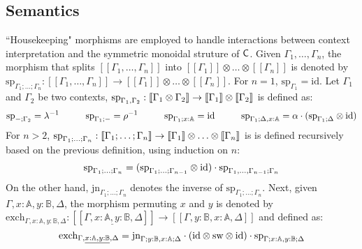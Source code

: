 \subsection{Semantics}

``Housekeeping" morphisms are employed to handle interactions between context interpretation and the symmetric monoidal struture of $\mathsf{C}$. Given $\Gamma_{1}, \ldots, \Gamma_{n}$, the morphism that splits $[\![\Gamma_{1}, \ldots, \Gamma_{n}]\!]$ into $[\![\Gamma_{1}]\!] \otimes \ldots \otimes [\![\Gamma_{n}]\!]  $ is denoted by $\text{sp}_{\Gamma_1;\ldots;\Gamma_n}: [\![\Gamma_{1}, \ldots, \Gamma_{n}]\!] \xrightarrow{} [\![\Gamma_{1}]\!] \otimes \ldots \otimes [\![\Gamma_{n}]\!] $. For $n=1$, $\text{sp}_{\Gamma_1} = \text{id}$.
Let $\Gamma_1$ and $\Gamma_2$ be two contexts, $\text{sp}_{\Gamma_1, \Gamma_2}: \left \llbracket  \Gamma_1\otimes \Gamma_2 \right \rrbracket \rightarrow \left \llbracket \Gamma_1 \right \rrbracket\otimes \left \llbracket \Gamma_2 \right \rrbracket$ is defined as:
\begin{equation*}
  \text{sp}_{-; \Gamma_2} = \lambda^{-1} \hspace{1cm} \text{sp}_{\Gamma_1; -} = \rho^{-1} \hspace{1cm} \text{sp}_{\Gamma_1;x:\mathbb{A}} = \mathrm{id} \hspace{1cm} \text{sp}_{\Gamma_1; \Delta, x: \mathbb{A}} = \alpha \cdot (\text{sp}_{\Gamma_1; \Delta} \otimes \mathrm{id})
\end{equation*}
For $n>2$, $\text{sp}_{\Gamma_1;\ldots;\Gamma_n}: \left \llbracket \Gamma_1;\ldots;\Gamma_n \right \rrbracket \to \left \llbracket \Gamma_1 \right \rrbracket \otimes \ldots \otimes \left \llbracket \Gamma_n \right \rrbracket $ is is defined recursively based on the previous definition, using induction on $n$:
\begin{equation*}
  \text{sp}_{\Gamma_1;\ldots;\Gamma_n} = (\text{sp}_{\Gamma_1;\ldots;\Gamma_{n-1}} \otimes \mathrm{id} )\cdot \text{sp}_{\Gamma_1, \ldots, \Gamma_{n-1} ;\Gamma_n}
\end{equation*}
On the other hand, $\text{jn}_{\Gamma_1;\ldots;\Gamma_n}$ denotes the inverse of $\text{sp}_{\Gamma_1;\ldots;\Gamma_n}$. Next, given $\Gamma, x : \mathbb{A}, y : \mathbb{B},\Delta$, the morphism permuting $x$ and $y$ is denoted by $\text{exch}_{\Gamma, x : \mathbb{A}, y : \mathbb{B},\Delta}: [\![\Gamma,\underline{ x : \mathbb{A}, y : \mathbb{B}},\Delta]\!] \xrightarrow{} [\![\Gamma, y : \mathbb{B}, x : \mathbb{A}, \Delta]\!] $ and defined as:
\begin{equation*}
  \text{exch}_{\Gamma, \underline{ x : \mathbb{A}, y : \mathbb{B}},\Delta} = \text{jn}_{\Gamma; y:\mathbb{B}, x:\mathbb{A};\Delta} \cdot (\mathrm{id} \otimes \text{sw} \otimes \mathrm{id} ) \cdot \text{sp}_{\Gamma; x:\mathbb{A}, y:\mathbb{B};\Delta}
\end{equation*} 


